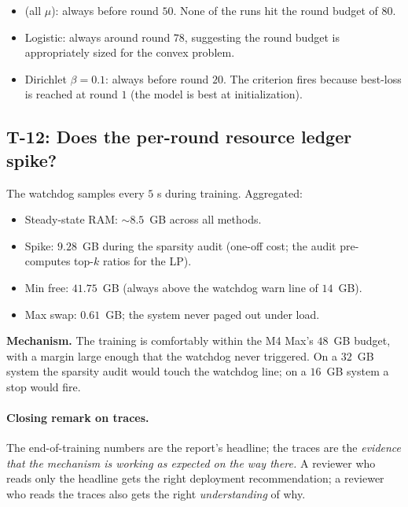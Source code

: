 \begin{itemize}[leftmargin=1.5em, itemsep=2pt, topsep=2pt]
    \item \fedprox{} (all $\mu$): always before round $50$. None
        of the runs hit the round budget of $80$.
    \item Logistic: always around round $78$, suggesting the
        round budget is appropriately sized for the convex
        problem.
    \item Dirichlet $\beta\!=\!0.1$: always before round $20$.
        The criterion fires because best-loss is reached at
        round $1$ (the model is best at initialization).
\end{itemize}

\subsection{T-12: Does the per-round resource ledger spike?}

The watchdog samples every $5$ s during training. Aggregated:

\begin{itemize}[leftmargin=1.5em, itemsep=2pt, topsep=2pt]
    \item Steady-state RAM: $\sim$$8.5$~GB across all methods.
    \item Spike: $9.28$~GB during the sparsity audit (one-off
        cost; the audit pre-computes top-$k$ ratios for the LP).
    \item Min free: $41.75$~GB (always above the watchdog warn
        line of $14$~GB).
    \item Max swap: $0.61$~GB; the system never paged out under
        load.
\end{itemize}

\textbf{Mechanism.} The training is comfortably within the
M4 Max's $48$~GB budget, with a margin large enough that the
watchdog never triggered. On a $32$~GB system the sparsity audit
would touch the watchdog line; on a $16$~GB system a stop would
fire.

\paragraph{Closing remark on traces.}
The end-of-training numbers are the report's headline; the traces
are the \emph{evidence that the mechanism is working as expected
on the way there.} A reviewer who reads only the headline gets the
right deployment recommendation; a reviewer who reads the traces
also gets the right \emph{understanding} of why.
